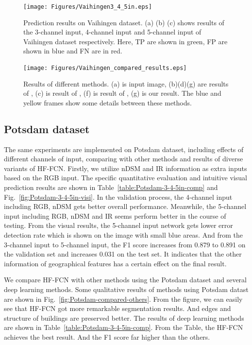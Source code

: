 \begin{figure}
\vspace{-0.45cm}
\setlength{\abovecaptionskip}{-0cm}
\setlength{\belowcaptionskip}{-2cm}
\centering
\texttt{[image: Figures/Vaihingen3\_4\_5in.eps]}
\caption{Prediction results on Vaihingen dataset. (a) (b) (c) shows results of the 3-channel input, 4-channel input and 5-channel input of Vaihingen dataset respectively. Here, TP are shown in green, FP are shown in blue and FN are in red.}
\label{fig:Vaihingen-3-4-5in}
\end{figure}

\begin{figure}
\setlength{\abovecaptionskip}{-0cm}
\setlength{\belowcaptionskip}{-1cm}
\centering
\texttt{[image: Figures/Vaihingen\_compared\_results.eps]}
\caption{Results of different methods. (a) is input image, (b)(d)(g) are results of \cite{IEEEexample:audebert2017deep}, (c) is result of \cite{IEEEexample:marmanis2016semantic}, (f) is result of \cite{IEEEexample:unknown}, (g) is our result. The blue and yellow frames show some details between these methods.}
\label{fig:Vaihingen-compared-others}
\end{figure}

\subsection{Potsdam dataset}
 The same experiments are implemented on Potsdam dataset, including effects of different channels of input, comparing with other methods and results of diverse variants of HF-FCN. Firstly, we utilize nDSM and IR information as extra inputs based on the RGB input. The specific quantitative evaluation and intuitive visual prediction results are shown in Table~\ref{table:Potsdam-3-4-5in-comp} and Fig.~\ref{fig:Potsdam-3-4-5in-visi}. In the validation process, the 4-channel input including RGB, nDSM gets better overall performance. Meanwhile, the 5-channel input including RGB, nDSM and IR seems perform better in the course of testing. From the visual results, the 5-channel input network gets lower error detection rate which is shown on the image with small blue areas. And from the 3-channel input to 5-channel input, the F1 score increases from 0.879 to 0.891 on the validation set and increases 0.031 on the test set. It indicates that the other information of geographical features has a certain effect on the final result.

 We compare HF-FCN with other methods using the Potsdam dataset and several deep learning methods. Some qualitative results of methods using Potsdam datast are shown in Fig.~\ref{fig:Potsdam-compared-others}.
 From the figure, we can easily see that HF-FCN got more remarkable segmentation results. And edges and structure of buildings are preserved better. The results of deep learning methods are shown in Table~\ref{table:Potsdam-3-4-5in-comp}. From the Table, the HF-FCN achieves the best result. And the F1 score far higher than the others.

